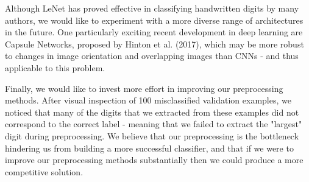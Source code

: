 \documentclass[letterpaper, 10 pt, conference]{ieeeconf}
\begin{document}
Although LeNet has proved effective in classifying handwritten digits by many authors, we would like to experiment with a more diverse range of architectures in the future. One particularly exciting recent development in deep learning are Capsule Networks, proposed by Hinton et al. (2017), which may be more robust to changes in image orientation and overlapping images than CNNs - and thus applicable to this problem. 

Finally, we would like to invest more effort in improving our preprocessing methods. After visual inspection of 100 misclassified validation examples, we noticed that many of the digits that we extracted from these examples did not correspond to the correct label - meaning that we failed to extract the "largest" digit during preprocessing. We believe that our preprocessing is the bottleneck hindering us from building a more successful classifier, and that if we were to improve our preprocessing methods substantially then we could produce a more competitive solution. 





\end{document}
